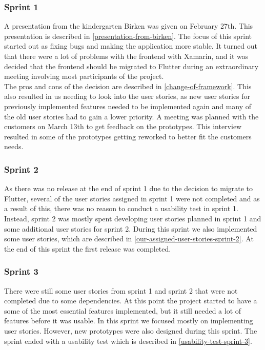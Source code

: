 \subsubsection{Sprint 1}
A presentation from the kindergarten Birken was given on February 27th.
This presentation is described in \autoref{presentation-from-birken}.
The focus of this sprint started out as fixing bugs and making the application more stable.
It turned out that there were a lot of problems with the frontend with Xamarin, and it was decided that the frontend should be migrated to Flutter during an extraordinary meeting involving most participants of the project. \\
The pros and cons of the decision are described in \autoref{change-of-framework}.
This also resulted in us needing to look into the user stories, as new user stories for previously implemented features needed to be implemented again and many of the old user stories had to gain a lower priority.
A meeting was planned with the customers on March 13th to get feedback on the prototypes. 
This interview resulted in some of the prototypes getting reworked to better fit the customers needs.

\subsubsection{Sprint 2}
As there was no release at the end of sprint 1 due to the decision to migrate to Flutter, several of the user stories assigned in sprint 1 were not completed and as a result of this, there was no reason to conduct a usability test in sprint 1.
Instead, sprint 2 was mostly spent developing user stories planned in sprint 1 and some additional user stories for sprint 2.
During this sprint we also implemented some user stories, which are described in \autoref{our-assigned-user-stories-sprint-2}.
At the end of this sprint the first release was completed.

\subsubsection{Sprint 3}
There were still some  user stories from sprint 1 and sprint 2 that were not completed due to some dependencies. 
At this point the project started to have a some of the most essential features implemented, but it still needed a lot of features before it was usable. 
In this sprint we focused mostly on implementing user stories.
However, new prototypes were also designed during this sprint. 
The sprint ended with a usability test which is described in \autoref{usability-test-sprint-3}.

